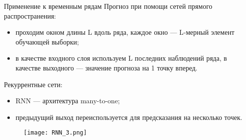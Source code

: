 \documentclass[11pt]{beamer}
\begin{document}
 \begin{frame}{Применение к временным рядам}
     Прогноз при помощи сетей прямого распространения:
     \begin{itemize}
         \item проходим окном длины L вдоль ряда, каждое окно — L-мерный
элемент обучающей выборки;
\item в качестве входного слоя используем L последних наблюдений ряда, в
качестве выходного — значение прогноза на 1 точку вперед.
     \end{itemize}


Рекуррентные сети:
\begin{itemize}
    \item RNN — архитектура many-to-one;
    \item предыдущий выход переиспользуется для предсказания на несколько
точек. 
\end{itemize}

      \begin{figure}
	        \centering
	        \texttt{[image: RNN\_3.png]}
	        
	    \end{figure}

 \end{frame}
\end{document}
